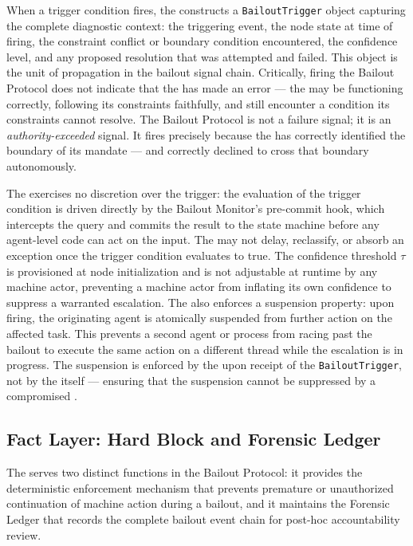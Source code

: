 When a trigger condition fires, the \bounds{} constructs a \texttt{BailoutTrigger} object capturing the complete diagnostic context: the triggering event, the node state at time of firing, the constraint conflict or boundary condition encountered, the \bounds{} confidence level, and any proposed resolution that was attempted and failed. This object is the unit of propagation in the bailout signal chain. Critically, firing the Bailout Protocol does not indicate that the \bounds{} has made an error — the \bounds{} may be functioning correctly, following its constraints faithfully, and still encounter a condition its constraints cannot resolve. The Bailout Protocol is not a failure signal; it is an \textit{authority-exceeded} signal. It fires precisely because the \bounds{} has correctly identified the boundary of its mandate — and correctly declined to cross that boundary autonomously.

The \bounds{} exercises no discretion over the trigger: the evaluation of the trigger condition is driven directly by the Bailout Monitor's pre-commit hook, which intercepts the query and commits the result to the state machine before any agent-level code can act on the input. The \bounds{} may not delay, reclassify, or absorb an exception once the trigger condition evaluates to true. The confidence threshold $\tau$ is provisioned at node initialization and is not adjustable at runtime by any machine actor, preventing a machine actor from inflating its own confidence to suppress a warranted escalation. The \bounds{} also enforces a suspension property: upon firing, the originating agent is atomically suspended from further action on the affected task. This prevents a second agent or process from racing past the bailout to execute the same action on a different thread while the escalation is in progress. The suspension is enforced by the \fact{} upon receipt of the \texttt{BailoutTrigger}, not by the \bounds{} itself — ensuring that the suspension cannot be suppressed by a compromised \bounds{}.

\subsection{Fact Layer: Hard Block and Forensic Ledger}
\label{sec:fact-enforcement}

The \fact{} serves two distinct functions in the Bailout Protocol: it provides the deterministic enforcement mechanism that prevents premature or unauthorized continuation of machine action during a bailout, and it maintains the Forensic Ledger that records the complete bailout event chain for post-hoc accountability review.


